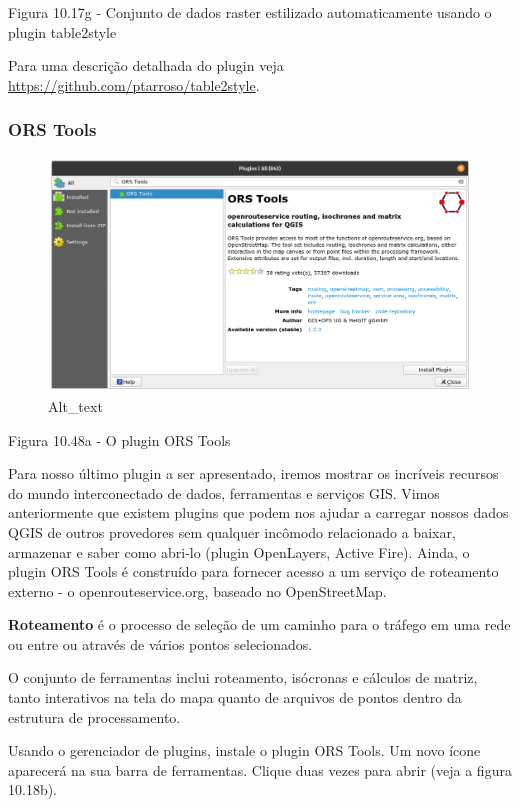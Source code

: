 \documentclass[
]{book}
\begin{document}
Figura 10.17g - Conjunto de dados raster estilizado automaticamente usando o plugin table2style

Para uma descrição detalhada do plugin veja \url{https://github.com/ptarroso/table2style}.

\hypertarget{ors-tools}{%
\subsubsection{\texorpdfstring{\textbf{ORS Tools}}{ORS Tools}}\label{ors-tools}}

\begin{figure}
\centering
\includegraphics{media/modulo10/fig1018_a.png}
\caption{Alt\_text}
\end{figure}

Figura 10.48a - O plugin ORS Tools

Para nosso último plugin a ser apresentado, iremos mostrar os incríveis recursos do mundo interconectado de dados, ferramentas e serviços GIS. Vimos anteriormente que existem plugins que podem nos ajudar a carregar nossos dados QGIS de outros provedores sem qualquer incômodo relacionado a baixar, armazenar e saber como abri-lo (plugin OpenLayers, Active Fire). Ainda, o plugin ORS Tools é construído para fornecer acesso a um serviço de roteamento externo - o openrouteservice.org, baseado no OpenStreetMap.

\textbf{Roteamento} é o processo de seleção de um caminho para o tráfego em uma rede ou entre ou através de vários pontos selecionados.

O conjunto de ferramentas inclui roteamento, isócronas e cálculos de matriz, tanto interativos na tela do mapa quanto de arquivos de pontos dentro da estrutura de processamento.

Usando o gerenciador de plugins, instale o plugin ORS Tools. Um novo ícone aparecerá na sua barra de ferramentas. Clique duas vezes para abrir (veja a figura 10.18b).
\end{document}
